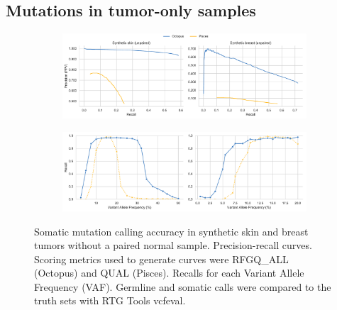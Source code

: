 \documentclass[notitlepage, twocolumn, 10pt]{article}
\begin{document}
\subsection*{Mutations in tumor-only samples}

\begin{figure}[tp]
    \centering
\captionsetup[subfigure]{position=top,labelfont=bf,textfont=normalfont,singlelinecheck=off,justification=raggedright}
    \begin{subfigure}[b]{\linewidth}
        \vspace{-0.5cm}
        \caption{}
        \includegraphics[width=\linewidth]{figures/tumour-only-precision-recalls}
        \label{fig:to-somatic_pr}
    \end{subfigure}
    \begin{subfigure}[b]{\linewidth}
        \vspace{-0.5cm}
        \caption{}
        \includegraphics[width=\linewidth]{figures/tumour-only-vaf-recalls}
        \label{fig:to-somatic_vaf_recall}
    \end{subfigure}
    \vspace{-1.cm}
    \caption{Somatic mutation calling accuracy in synthetic skin and breast tumors without a paired normal sample. \protect{} Precision-recall curves. Scoring metrics used to generate curves were RFGQ\_ALL (Octopus) and QUAL (Pisces). \protect{} Recalls for each Variant Allele Frequency (VAF). Germline and somatic calls were compared to the truth sets with RTG Tools vcfeval.}
    \label{fig:tumor-only-eval}
\end{figure}
\end{document}
